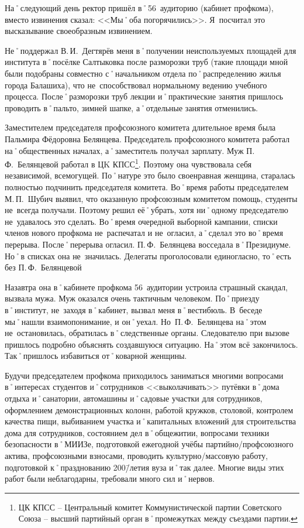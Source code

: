 На˚следующий день ректор пришёл в˚56~аудиторию (кабинет профкома), вместо извинения сказал: <<Мы˚оба погорячились>>. Я~посчитал это высказывание своеобразным извинением.

Не˚поддержал В.\,И.~Дегтярёв меня в˚получении неиспользуемых площадей для института в˚посёлке Салтыковка после разморозки труб (такие площади мной были подобраны совместно с˚начальником отдела по˚распределению жилья города Балашиха), что не~способствовал нормальному ведению учебного процесса. После˚разморозки труб лекции и˚практические занятия пришлось проводить в˚пальто, зимней шапке, а˚отдельные занятия отменились.

Заместителем председателя профсоюзного комитета длительное время была Пальмира Фёдоровна Белянцева. Председатель профсоюзного комитета работал на˚общественных началах, а˚заместитель получал зарплату. Муж П.\,Ф.~Белянцевой работал в ЦK КПСС\footnote{ЦК КПСС \--- Центральный комитет Коммунистической партии Советского Союза \--- высший партийный орган в˚промежутках между съездами партии.}. Поэтому она чувствовала себя независимой, всемогущей. По˚натуре это было своенравная женщина, старалась полностью подчинить председателя комитета. Во˚время работы председателем М.\,П.~Шубич выявил, что оказанную профсоюзным комитетом помощь, студенты не~всегда получали. Поэтому решил её˚убрать, хотя ни˚одному председателю не~удавалось это сделать. Во˚время очередной выборной кампании, списки членов нового профкома не~распечатал и не~огласил, а˚сделал это во˚время перерыва. После˚перерыва огласил. П.\,Ф.~Белянцева восседала в˚Президиуме. Но˚в списках она не~значилась. Делегаты проголосовали единогласно, то˚есть без П.\,Ф.~Белянцевой 

Назавтра она в˚кабинете профкома 56~аудитории устроила страшный скандал, вызвала мужа. Муж оказался очень тактичным человеком. По˚приезду в˚институт, не~заходя в˚кабинет, вызвал меня в˚вестибюль. В~беседе мы˚нашли взаимопонимание, и он˚уехал. Но~П.\,Ф.~Белянцева на˚этом не~остановилась, обратилась в˚следственные органы. Следователю при вызове пришлось подробно объяснять создавшуюся ситуацию. На˚этом всё закончилось. Так˚пришлось избавиться от˚коварной женщины. 

Будучи председателем профкома приходилось заниматься многими вопросами в˚интересах студентов и˚сотрудников <<выколачивать>> путёвки в˚дома отдыха и˚санатории, автомашины и˚садовые участки для сотрудников, оформлением демонстрационных колонн, работой кружков, столовой, контролем качества пищи, выбиванием участка и˚капитальных вложений для строительства дома для сотрудников, состоянием дел в˚общежитии, вопросами техники безопасности в˚МИИЗе, подготовкой ежегодной учёбы партийно\-/профсоюзного актива, профсоюзными взносами, проводить культурно\-/массовую работу, подготовкой к˚празднованию 200\=/летия вуза и˚так далее. Многие виды этих работ были неблагодарны, требовали много сил и˚нервов. 

